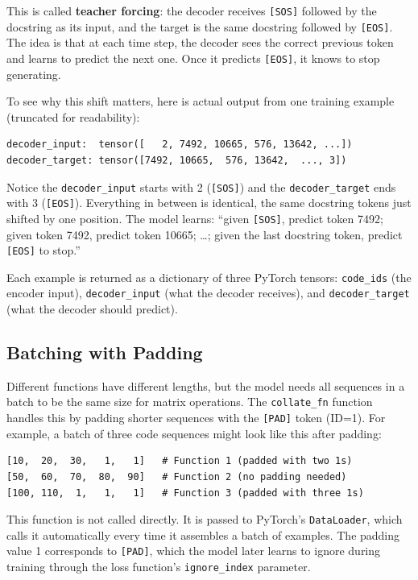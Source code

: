 \documentclass[11pt]{article}
\begin{document}
This is called \textbf{teacher forcing}: the decoder receives \texttt{[SOS]} followed by the docstring as its input, and the target is the same docstring followed by \texttt{[EOS]}. The idea is that at each time step, the decoder sees the correct previous token and learns to predict the next one. Once it predicts \texttt{[EOS]}, it knows to stop generating.

To see why this shift matters, here is actual output from one training example (truncated for readability):

\begin{lstlisting}[style=plain]
decoder_input:  tensor([   2, 7492, 10665, 576, 13642, ...])
decoder_target: tensor([7492, 10665,  576, 13642,  ..., 3])
\end{lstlisting}

Notice the \texttt{decoder\_input} starts with 2 (\texttt{[SOS]}) and the \texttt{decoder\_target} ends with 3 (\texttt{[EOS]}). Everything in between is identical, the same docstring tokens just shifted by one position. The model learns: ``given \texttt{[SOS]}, predict token 7492; given token 7492, predict token 10665; \ldots; given the last docstring token, predict \texttt{[EOS]} to stop.''

Each example is returned as a dictionary of three PyTorch tensors: \texttt{code\_ids} (the encoder input), \texttt{decoder\_input} (what the decoder receives), and \texttt{decoder\_target} (what the decoder should predict).

\subsection{Batching with Padding}

Different functions have different lengths, but the model needs all sequences in a batch to be the same size for matrix operations. The \texttt{collate\_fn} function handles this by padding shorter sequences with the \texttt{[PAD]} token (ID=1). For example, a batch of three code sequences might look like this after padding:

\begin{lstlisting}[style=plain]
[10,  20,  30,   1,   1]   # Function 1 (padded with two 1s)
[50,  60,  70,  80,  90]   # Function 2 (no padding needed)
[100, 110,  1,   1,   1]   # Function 3 (padded with three 1s)
\end{lstlisting}

This function is not called directly. It is passed to PyTorch's \texttt{DataLoader}, which calls it automatically every time it assembles a batch of examples. The padding value 1 corresponds to \texttt{[PAD]}, which the model later learns to ignore during training through the loss function's \texttt{ignore\_index} parameter.
\end{document}

